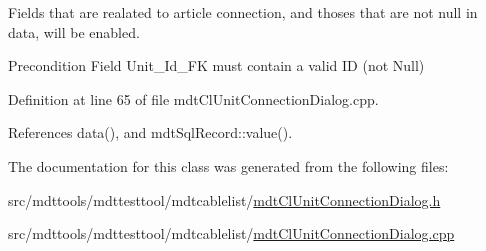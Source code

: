 Fields that are realated to article connection, and thoses that are not null in data, will be enabled.

\begin{DoxyPrecond}{Precondition}
Field Unit\-\_\-\-Id\-\_\-\-F\-K must contain a valid I\-D (not Null) 
\end{DoxyPrecond}


Definition at line 65 of file mdt\-Cl\-Unit\-Connection\-Dialog.\-cpp.



References data(), and mdt\-Sql\-Record\-::value().



The documentation for this class was generated from the following files\-:\begin{DoxyCompactItemize}
\item 
src/mdttools/mdttesttool/mdtcablelist/\hyperlink{mdt_cl_unit_connection_dialog_8h}{mdt\-Cl\-Unit\-Connection\-Dialog.\-h}\item 
src/mdttools/mdttesttool/mdtcablelist/\hyperlink{mdt_cl_unit_connection_dialog_8cpp}{mdt\-Cl\-Unit\-Connection\-Dialog.\-cpp}\end{DoxyCompactItemize}
